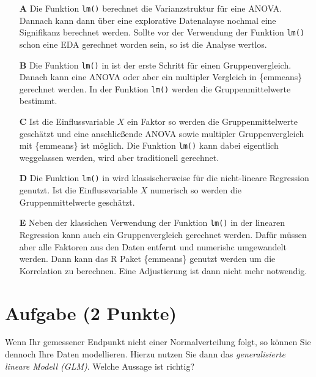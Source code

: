 \documentclass[a4paper, 9pt]{scrartcl}\usepackage[]{graphicx}\usepackage[]{xcolor}
\begin{document}
\begin{enumerate}
\item [\textbf{A} \msquare] Die Funktion \texttt{lm()} berechnet die Varianzstruktur für eine ANOVA. Dannach kann dann über eine explorative Datenalayse nochmal eine Signifikanz berechnet werden. Sollte vor der Verwendung der Funktion \texttt{lm()} schon eine EDA gerechnet worden sein, so ist die Analyse wertlos.
\item [\textbf{B} \msquare] Die Funktion \texttt{lm()} in \Rlogo ist der erste Schritt für einen Gruppenvergleich. Danach kann eine ANOVA oder aber ein multipler Vergleich in \{emmeans\} gerechnet werden. In der Funktion  \texttt{lm()} werden die Gruppenmittelwerte bestimmt.
\item [\textbf{C} \msquare] Ist die Einflussvariable $X$ ein Faktor so werden die Gruppenmittelwerte geschätzt und eine anschließende ANOVA sowie multipler Gruppenvergleich mit \{emmeans\} ist möglich. Die Funktion \texttt{lm()} kann dabei eigentlich weggelassen werden, wird aber traditionell gerechnet.
\item [\textbf{D} \msquare] Die Funktion \texttt{lm()} in \Rlogo wird klassischerweise für die nicht-lineare Regression genutzt. Ist die Einflussvariable $X$ numerisch so werden die Gruppenmittelwerte geschätzt.
\item [\textbf{E} \msquare] Neben der klassichen Verwendung der Funktion \texttt{lm()} in der linearen Regression kann auch ein Gruppenvergleich gerechnet werden. Dafür müssen aber alle Faktoren aus den Daten entfernt und numerishc umgewandelt werden. Dann kann das R Paket \{emmeans\} genutzt werden um die Korrelation zu berechnen. Eine Adjustierung ist dann nicht mehr notwendig.
\end{enumerate}

\section{Aufgabe \hfill (2 Punkte)}



Wenn Ihr gemessener Endpunkt nicht einer Normalverteilung folgt, so können Sie dennoch Ihre Daten modellieren. Hierzu nutzen Sie dann das \textit{generalisierte lineare Modell (GLM)}. Welche Aussage ist richtig?
\end{document}
